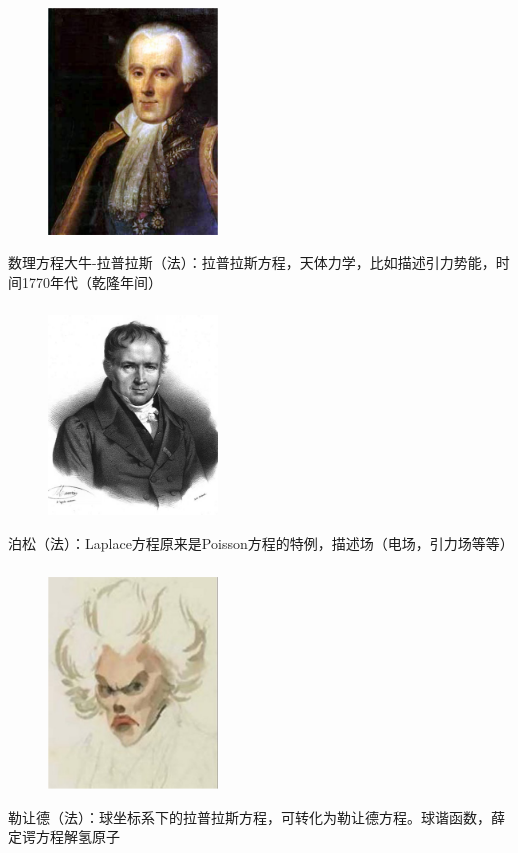 \begin{frame}
	\frametitle{}
	\begin{center}
		\begin{figure}
			\includegraphics[width=4.5cm]{figs/fig1-3-1.png}	
		\end{figure}
	\end{center}
	{数理方程大牛-拉普拉斯（法）：拉普拉斯方程，天体力学，比如描述引力势能，时间1770年代（乾隆年间）}
\end{frame}

\begin{frame}
	\frametitle{}
	\begin{center}
		\begin{figure}
			\includegraphics[width=4.5cm]{figs/fig1-3-4.png}	
		\end{figure}
	\end{center}
		{泊松（法）：Laplace方程原来是Poisson方程的特例，描述场（电场，引力场等等）}
\end{frame}

\begin{frame}
	\frametitle{}
	\begin{center}
		\begin{figure}
			\includegraphics[width=4.5cm]{figs/fig1-3-5.png}	
		\end{figure}
	\end{center}
		{勒让德（法）：球坐标系下的拉普拉斯方程，可转化为勒让德方程。球谐函数，薛定谔方程解氢原子}
\end{frame}

